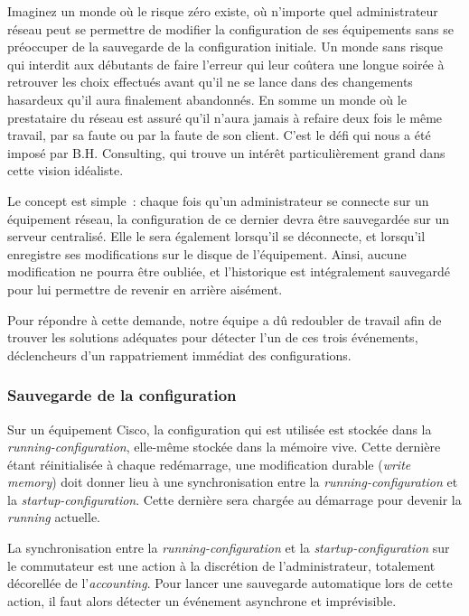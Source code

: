 Imaginez un monde où le risque zéro existe, où n'importe quel administrateur réseau peut se permettre de modifier la configuration de ses équipements sans se préoccuper de la sauvegarde de la configuration initiale. Un monde sans risque qui interdit aux débutants de faire l'erreur qui leur coûtera une longue soirée à retrouver les choix effectués avant qu'il ne se lance dans des changements hasardeux qu'il aura finalement abandonnés. En somme un monde où le prestataire du réseau est assuré qu'il n'aura jamais à refaire deux fois le même travail, par sa faute ou par la faute de son client. C'est le défi qui nous a été imposé par B.H. Consulting, qui trouve un intérêt particulièrement grand dans cette vision idéaliste.

Le concept est simple~: chaque fois qu'un administrateur se connecte sur un équipement réseau, la configuration de ce dernier devra être sauvegardée sur un serveur centralisé. Elle le sera également lorsqu'il se déconnecte, et lorsqu'il enregistre ses modifications sur le disque de l'équipement. Ainsi, aucune modification ne pourra être oubliée, et l'historique est intégralement sauvegardé pour lui permettre de revenir en arrière aisément.

Pour répondre à cette demande, notre équipe a dû redoubler de travail afin de trouver les solutions adéquates pour détecter l'un de ces trois événements, déclencheurs d'un rappatriement immédiat des configurations.

\subsubsection{Sauvegarde de la configuration}

Sur un équipement Cisco, la configuration qui est utilisée est stockée dans la \emph{running-configuration}, elle-même stockée dans la mémoire vive. Cette dernière étant réinitialisée à chaque redémarrage, une modification durable (\emph{write memory}) doit donner lieu à une synchronisation entre la \emph{running-configuration} et la \emph{startup-configuration}. Cette dernière sera chargée au démarrage pour devenir la \emph{running} actuelle. 

La synchronisation entre la \emph{running-configuration} et la \emph{startup-configuration} sur le commutateur est une action à la discrétion de l'administrateur, totalement décorellée de l'\emph{accounting}. Pour lancer une sauvegarde automatique lors de cette action, il faut alors détecter un événement asynchrone et imprévisible.

